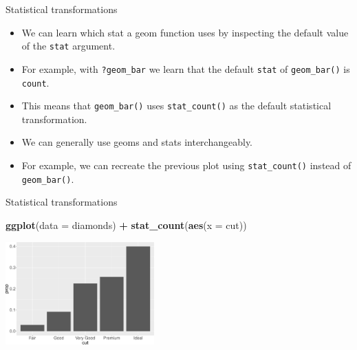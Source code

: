 \documentclass[ignorenonframetext,]{beamer}
\newenvironment{Shaded}{\begin{snugshade}}{\end{snugshade}}
\newcommand{\DataTypeTok}[1]{\textcolor[rgb]{0.13,0.29,0.53}{#1}}
\newcommand{\KeywordTok}[1]{\textcolor[rgb]{0.13,0.29,0.53}{\textbf{#1}}}
\newcommand{\NormalTok}[1]{#1}
\newcommand{\OperatorTok}[1]{\textcolor[rgb]{0.81,0.36,0.00}{\textbf{#1}}}
\newcommand{\StringTok}[1]{\textcolor[rgb]{0.31,0.60,0.02}{#1}}
\begin{document}
\begin{frame}[fragile]{Statistical transformations}
\protect\hypertarget{statistical-transformations-4}{}

\begin{itemize}
\item
  We can learn which stat a geom function uses by inspecting the default
  value of the \texttt{stat} argument.
\item
  For example, with \texttt{?geom\_bar} we learn that the default
  \texttt{stat} of \texttt{geom\_bar()} is \texttt{count}.
\item
  This means that \texttt{geom\_bar()} uses \texttt{stat\_count()} as
  the default statistical transformation.
\item
  We can generally use geoms and stats interchangeably.
\item
  For example, we can recreate the previous plot using
  \texttt{stat\_count()} instead of \texttt{geom\_bar()}.
\end{itemize}

\end{frame}

\begin{frame}[fragile]{Statistical transformations}
\protect\hypertarget{statistical-transformations-5}{}

\begin{Shaded}
\begin{Highlighting}[]
\KeywordTok{ggplot}\NormalTok{(}\DataTypeTok{data =}\NormalTok{ diamonds) }\OperatorTok{+}\StringTok{ }
\StringTok{  }\KeywordTok{stat_count}\NormalTok{(}\KeywordTok{aes}\NormalTok{(}\DataTypeTok{x =}\NormalTok{ cut))}
\end{Highlighting}
\end{Shaded}

\begin{center}\includegraphics[height=150px]{data-visualization_files/figure-beamer/unnamed-chunk-122-1} \end{center}

\end{frame}
\end{document}
